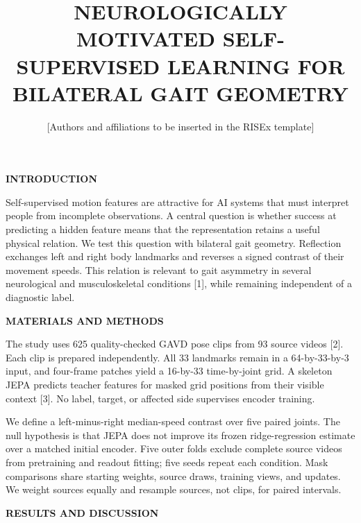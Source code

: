 \documentclass[11pt,letterpaper]{article}
\title{\vspace{-1.2em}\textbf{\MakeUppercase{Neurologically Motivated
Self-Supervised Learning for Bilateral Gait Geometry}}\vspace{-0.5em}}
\author{\normalsize [Authors and affiliations to be inserted in the RISEx template]}
\date{}
\renewcommand{\subsection}[1]{\vspace{2pt}\noindent\textbf{#1}\par\vspace{1pt}}
\begin{document}
\twocolumn[
  \begin{@twocolumnfalse}
  \maketitle
  \vspace{-1.1em}
  \end{@twocolumnfalse}
]
\subsection{INTRODUCTION}\label{introduction}

Self-supervised motion features are attractive for AI systems that must
interpret people from incomplete observations. A central question is
whether success at predicting a hidden feature means that the
representation retains a useful physical relation. We test this question
with bilateral gait geometry. Reflection exchanges left and right body
landmarks and reverses a signed contrast of their movement speeds. This
relation is relevant to gait asymmetry in several neurological and
musculoskeletal conditions {[}1{]}, while remaining independent of a
diagnostic label.

\subsection{MATERIALS AND METHODS}\label{materials-and-methods}

The study uses 625 quality-checked GAVD pose clips from 93 source videos
{[}2{]}. Each clip is prepared independently. All 33 landmarks remain in
a 64-by-33-by-3 input, and four-frame patches yield a 16-by-33
time-by-joint grid. A skeleton JEPA predicts teacher features for masked
grid positions from their visible context {[}3{]}. No label, target, or
affected side supervises encoder training.

We define a left-minus-right median-speed contrast over five paired
joints. The null hypothesis is that JEPA does not improve its frozen
ridge-regression estimate over a matched initial encoder. Five outer
folds exclude complete source videos from pretraining and readout
fitting; five seeds repeat each condition. Mask comparisons share
starting weights, source draws, training views, and updates. We weight
sources equally and resample sources, not clips, for paired intervals.

\subsection{RESULTS AND DISCUSSION}\label{results-and-discussion}
\end{document}
